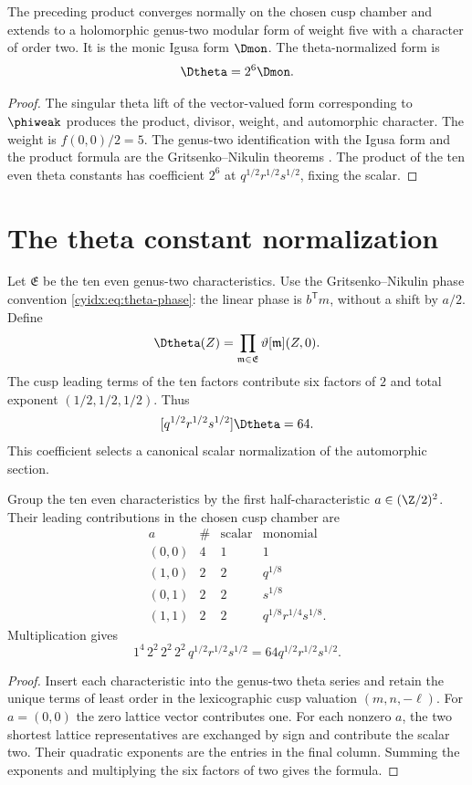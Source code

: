 \begin{theorem}
The preceding product converges normally on the chosen cusp chamber and extends to a holomorphic genus-two modular form of weight five with a character of order two. It is the monic Igusa form $\Dmon$. The theta-normalized form is
\[
 \Dtheta=2^6\Dmon.
\]
\end{theorem}
\begin{proof}
The singular theta lift of the vector-valued form corresponding to $\phiweak$ produces the product, divisor, weight, and automorphic character. The weight is $f(0,0)/2=5$. The genus-two identification with the Igusa form and the product formula are the Gritsenko--Nikulin theorems \cite{Borcherds95,Borcherds98,GN97,GN98b}. The product of the ten even theta constants has coefficient $2^6$ at $q^{1/2}r^{1/2}s^{1/2}$, fixing the scalar.
\end{proof}

\section{The theta constant normalization}
Let $\mathfrak E$ be the ten even genus-two characteristics.
Use the Gritsenko--Nikulin phase convention
\eqref{cyidx:eq:theta-phase}: the linear phase is
$b^{\mathsf T}m$, without a shift by $a/2$. Define
\[
 \Dtheta(Z)=\prod_{\mathfrak m\in\mathfrak E}\vartheta[\mathfrak m](Z,0).
\]
The cusp leading terms of the ten factors contribute six factors of $2$ and total exponent $(1/2,1/2,1/2)$. Thus
\[
 [q^{1/2}r^{1/2}s^{1/2}]\Dtheta=64.
\]
This coefficient selects a canonical scalar normalization of the automorphic section.

\begin{proposition}
Group the ten even characteristics by the first half-characteristic $a\in(\Z/2)^2$. Their leading contributions in the chosen cusp chamber are
\[
\begin{array}{c|c|c|c}
a&\#&\text{scalar}&\text{monomial}\\ \hline
(0,0)&4&1&1\\
(1,0)&2&2&q^{1/8}\\
(0,1)&2&2&s^{1/8}\\
(1,1)&2&2&q^{1/8}r^{1/4}s^{1/8}.
\end{array}
\]
Multiplication gives
\[
 1^4\,2^2\,2^2\,2^2\,
 q^{1/2}r^{1/2}s^{1/2}
 =64q^{1/2}r^{1/2}s^{1/2}.
\]
\end{proposition}
\begin{proof}
Insert each characteristic into the genus-two theta series and retain the unique terms of least order in the lexicographic cusp valuation $(m,n,-\ell)$. For $a=(0,0)$ the zero lattice vector contributes one. For each nonzero $a$, the two shortest lattice representatives are exchanged by sign and contribute the scalar two. Their quadratic exponents are the entries in the final column. Summing the exponents and multiplying the six factors of two gives the formula.
\end{proof}

